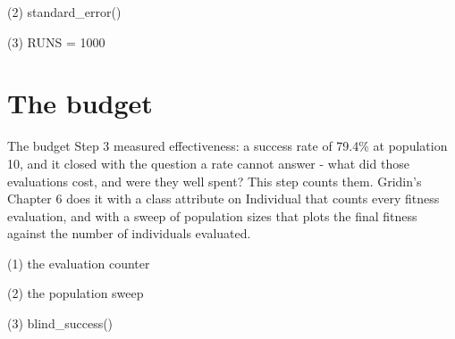 \begin{frame}[fragile]{(2) standard\_error()}

\end{frame}

\begin{frame}[fragile]{(3) RUNS = 1000}

\end{frame}


\section{The budget}

\begin{frame}{The budget}
Step 3 measured effectiveness: a success rate of 79.4\% at population 10, and
it closed with the question a rate cannot answer - what did those evaluations
cost, and were they well spent? This step counts them. Gridin's Chapter 6
does it with a class attribute on Individual that counts every fitness
evaluation, and with a sweep of population sizes that plots the final fitness
against the number of individuals evaluated.
\end{frame}

\begin{frame}[fragile]{(1) the evaluation counter}

\end{frame}

\begin{frame}[fragile]{(2) the population sweep}

\end{frame}

\begin{frame}[fragile]{(3) blind\_success()}

\end{frame}

